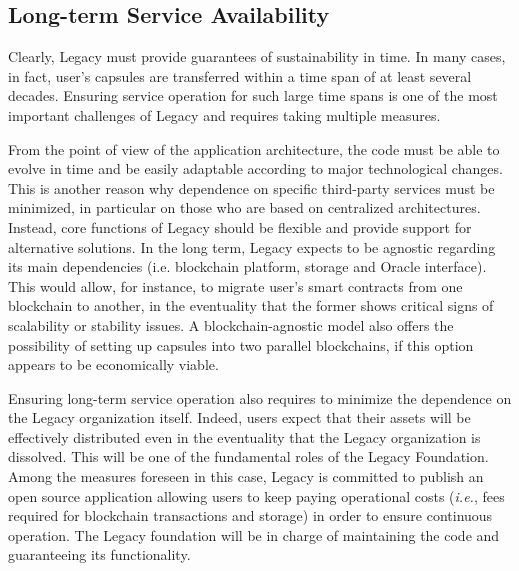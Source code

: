 \subsection{Long-term Service Availability} %
\label{sub:long_term_service_availability}
Clearly, Legacy must provide guarantees of sustainability in time. In many cases, in fact, user's capsules are transferred within a time span of at least several decades.  Ensuring service operation for such large time spans is one of the most important challenges of Legacy and requires taking multiple measures. 

From the point of view of the application architecture, the code must be able to evolve in time and be easily adaptable according to major technological changes. This is another reason why dependence on specific third-party services must be minimized, in particular on those who are based on centralized architectures. Instead, core functions of Legacy should be flexible and provide support for alternative solutions. In the long term, Legacy expects to be agnostic regarding its main dependencies (i.e. blockchain platform, storage and Oracle interface). This would allow, for instance, to migrate user’s smart contracts from one blockchain to another, in the eventuality that the former shows critical signs of scalability or stability issues. A blockchain-agnostic model also offers the possibility of setting up capsules into two parallel blockchains, if this option appears to be economically viable.    

Ensuring long-term service operation also requires to minimize the dependence on the Legacy organization itself. Indeed, users expect that their assets will be effectively distributed even in the eventuality that the Legacy organization is dissolved. 
This will be one of the fundamental roles of the Legacy Foundation. Among the measures foreseen in this case, Legacy is committed to publish an open source application allowing users to keep paying operational costs (\textit{i.e.}, fees required for blockchain transactions and storage) in order to ensure continuous operation. The Legacy foundation will be in charge of maintaining the code and guaranteeing its functionality.






